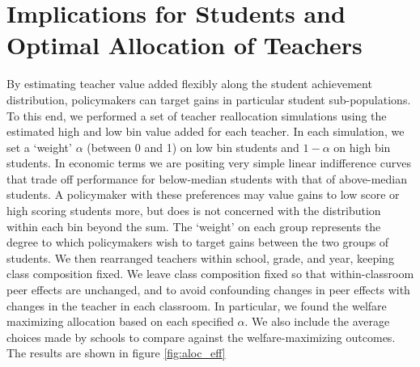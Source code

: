 \documentclass[12pt]{article}
\theoremstyle{definition}
\theoremstyle{definition}
\theoremstyle{definition}
\theoremstyle{definition}
\begin{document}

\section{Implications for Students and Optimal Allocation of Teachers} \label{swell}

By estimating teacher value added flexibly along the student achievement distribution, policymakers can target gains in particular student sub-populations. To this end, we performed a set of teacher reallocation simulations using the estimated high and low bin value added for each teacher. In each simulation, we set a ‘weight’ $\alpha$ (between 0 and 1) on low bin students and $1 - \alpha$ on high bin students. In economic terms we are positing very simple linear indifference curves that trade off performance for below-median students with that of above-median students. A policymaker with these preferences may value gains to low score or high scoring students more, but does is not concerned with the distribution within each bin beyond the sum. The ‘weight’ on each group represents the degree to which policymakers wish to target gains between the two groups of students. We then rearranged teachers within school, grade, and year, keeping class composition fixed. We leave class composition fixed so that within-classroom peer effects are unchanged, and to avoid confounding changes in peer effects with changes in the teacher in each classroom. In particular, we found the welfare maximizing allocation based on each specified $\alpha$. We also include the average choices made by schools to compare against the welfare-maximizing outcomes. The results are shown in figure \ref{fig:aloc_eff}
\end{document}
